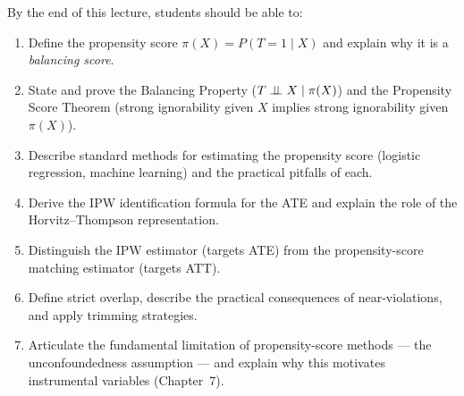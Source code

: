 \documentclass[master.tex]{subfiles}
\begin{document}

\begin{tcolorbox}[defstyle, title={Learning Objectives}]
By the end of this lecture, students should be able to:
\begin{enumerate}
  \item Define the propensity score $\pi(X) = P(T{=}1 \mid X)$ and
    explain why it is a \emph{balancing score}.
  \item State and prove the Balancing Property ($T \perp\!\!\!\perp X \mid \pi(X)$)
    and the Propensity Score Theorem (strong ignorability given $X$
    implies strong ignorability given $\pi(X)$).
  \item Describe standard methods for estimating the propensity score
    (logistic regression, machine learning) and the practical pitfalls
    of each.
  \item Derive the IPW identification formula for the ATE and explain
    the role of the Horvitz--Thompson representation.
  \item Distinguish the IPW estimator (targets ATE) from the
    propensity-score matching estimator (targets ATT).
  \item Define strict overlap, describe the practical consequences of
    near-violations, and apply trimming strategies.
  \item Articulate the fundamental limitation of propensity-score
    methods --- the unconfoundedness assumption --- and explain why this
    motivates instrumental variables (Chapter~7).
\end{enumerate}
\end{tcolorbox}
\end{document}
